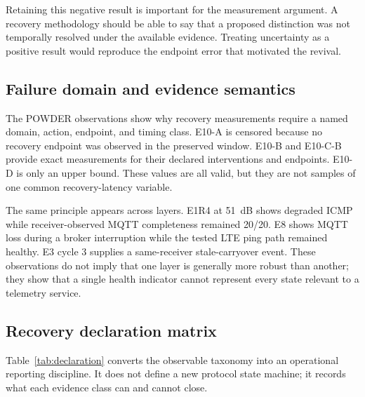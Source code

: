 \documentclass[journal]{IEEEtran}
\begin{document}
Retaining this negative result is important for the measurement argument. A recovery methodology should be able to say that a proposed distinction was not temporally resolved under the available evidence. Treating uncertainty as a positive result would reproduce the endpoint error that motivated the revival.

\subsection{Failure domain and evidence semantics}

The POWDER observations show why recovery measurements require a named domain, action, endpoint, and timing class. E10-A is censored because no recovery endpoint was observed in the preserved window. E10-B and E10-C-B provide exact measurements for their declared interventions and endpoints. E10-D is only an upper bound. These values are all valid, but they are not samples of one common recovery-latency variable.

The same principle appears across layers. E1R4 at 51~dB shows degraded ICMP while receiver-observed MQTT completeness remained 20/20. E8 shows MQTT loss during a broker interruption while the tested LTE ping path remained healthy. E3 cycle 3 supplies a same-receiver stale-carryover event. These observations do not imply that one layer is generally more robust than another; they show that a single health indicator cannot represent every state relevant to a telemetry service.

\subsection{Recovery declaration matrix}

Table~\ref{tab:declaration} converts the observable taxonomy into an operational reporting discipline. It does not define a new protocol state machine; it records what each evidence class can and cannot close.
\end{document}
